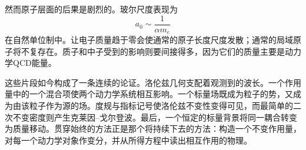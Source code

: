 \begin{classroomqa}
\end{classroomqa}

\begin{classroomqa}
\end{classroomqa}

然而原子层面的后果是剧烈的。玻尔尺度表现为
\begin{equation}
a_0\sim\frac{1}{\alpha m_e}
\end{equation}
在自然单位制中。让电子质量趋于零会使通常的原子长度尺度发散；通常的局域原子将不复存在。质子和中子受到的影响则要间接得多，因为它们的质量主要是动力学QCD能量。

这些片段如今构成了一条连续的论证。洛伦兹几何支配着观测到的波长。一个作用量中的一个混合项使两个动力学系统相互影响。一个标量场既成为粒子的势，又成为由该粒子作为源的场。度规与指标记号使洛伦兹不变性变得可见，而最简单的二次不变密度则产生克莱因--戈尔登波。最后，一个恒定的标量背景将同一耦合转变为质量移动。贯穿始终的方法正是那个将持续下去的方法：构造一个不变作用量，对每一个动力学对象作变分，并从所得方程中读出相互作用的物理。